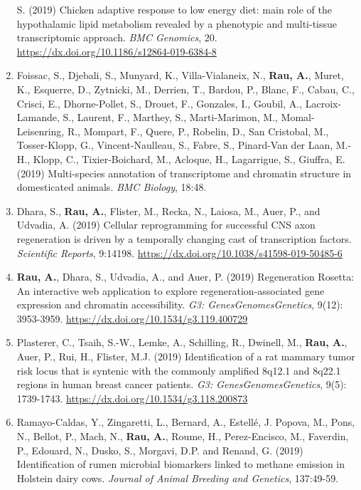 \documentclass[11pt, a4paper]{awesome-cv}
\begin{document}
\begin{enumerate}
  S. (2019) Chicken adaptive response to low energy diet: main role of
  the hypothalamic lipid metabolism revealed by a phenotypic and
  multi-tissue transcriptomic approach. \emph{BMC Genomics}, 20.
  \url{https://dx.doi.org/10.1186/s12864-019-6384-8}
\item
  Foissac, S., Djebali, S., Munyard, K., Villa-Vialaneix, N.,
  \textbf{Rau, A.}, Muret, K., Esquerre, D., Zytnicki, M., Derrien, T.,
  Bardou, P., Blanc, F., Cabau, C., Crisci, E., Dhorne-Pollet, S.,
  Drouet, F., Gonzales, I., Goubil, A., Lacroix-Lamande, S., Laurent,
  F., Marthey, S., Marti-Marimon, M., Momal-Leisenring, R., Mompart, F.,
  Quere, P., Robelin, D., San Cristobal, M., Tosser-Klopp, G.,
  Vincent-Naulleau, S., Fabre, S., Pinard-Van der Laan, M.-H., Klopp,
  C., Tixier-Boichard, M., Acloque, H., Lagarrigue, S., Giuffra, E.
  (2019) Multi-species annotation of transcriptome and chromatin
  structure in domesticated animals. \emph{BMC Biology}, 18:48.
\item
  Dhara, S., \textbf{Rau, A.}, Flister, M., Recka, N., Laiosa, M., Auer,
  P., and Udvadia, A. (2019) Cellular reprogramming for successful CNS
  axon regeneration is driven by a temporally changing cast of
  transcription factors. \emph{Scientific Reports}, 9:14198.
  \url{https://dx.doi.org/10.1038/s41598-019-50485-6}
\item
  \textbf{Rau, A.}, Dhara, S., Udvadia, A., and Auer, P. (2019)
  Regeneration Rosetta: An interactive web application to explore
  regeneration-associated gene expression and chromatin accessibility.
  \emph{G3: Genes\textbar Genomes\textbar Genetics}, 9(12): 3953-3959.
  \url{https://dx.doi.org/10.1534/g3.119.400729}
\item
  Plasterer, C., Tsaih, S.-W., Lemke, A., Schilling, R., Dwinell, M.,
  \textbf{Rau, A.}, Auer, P., Rui, H., Flister, M.J. (2019)
  Identification of a rat mammary tumor risk locus that is syntenic with
  the commonly amplified 8q12.1 and 8q22.1 regions in human breast
  cancer patients. \emph{G3: Genes\textbar Genomes\textbar Genetics},
  9(5): 1739-1743. \url{https://dx.doi.org/10.1534/g3.118.200873}
\item
  Ramayo-Caldas, Y., Zingaretti, L., Bernard, A., Estellé, J. Popova,
  M., Pons, N., Bellot, P., Mach, N., \textbf{Rau, A.}, Roume, H.,
  Perez-Encisco, M., Faverdin, P., Edouard, N., Dusko, S., Morgavi, D.P.
  and Renand, G. (2019) Identification of rumen microbial biomarkers
  linked to methane emission in Holstein dairy cows. \emph{Journal of
  Animal Breeding and Genetics}, 137:49-59.

\end{enumerate}
\end{document}
